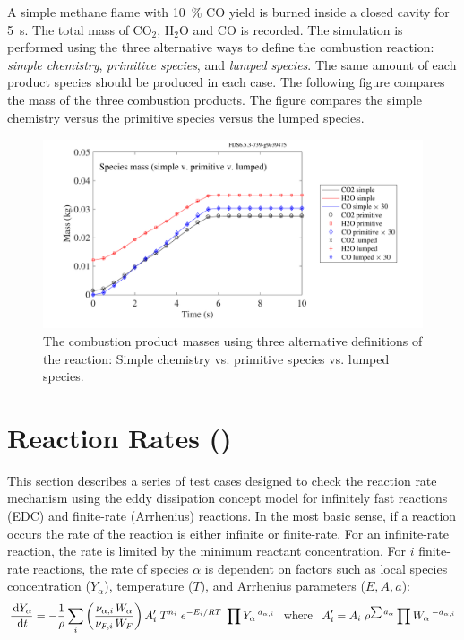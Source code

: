 \documentclass[11pt]{book}
\begin{document}
A simple methane flame with 10~\% CO yield is burned inside a closed cavity for 5~s.
The total mass of CO$_2$, H$_2$O and CO is recorded.
The simulation is performed using the three alternative ways
to define the combustion reaction: {\em simple chemistry}, {\em primitive species}, and {\em lumped species}. The
same amount of each product species should be produced in each case. The following figure compares the
mass of the three combustion products. The figure compares the simple chemistry versus the primitive species versus the lumped species.
\begin{figure}[ht]
\centering
\includegraphics[height=2.2in]{SCRIPT_FIGURES/methane_flame_reac_comp}
\caption[Yield of combustion products for alternative reactions]{The combustion product masses using three alternative definitions of the reaction:  Simple chemistry vs. primitive species vs. lumped species. }
\label{fig_methane_flame_yields}
\end{figure}


\section{Reaction Rates (\texorpdfstring{}{reactionrate})}

This section describes a series of test cases designed to check the reaction rate mechanism using the eddy dissipation concept model for infinitely fast reactions (EDC) and  finite-rate (Arrhenius) reactions. In the most basic sense, if a reaction occurs the rate of the reaction is either infinite or finite-rate. For an infinite-rate reaction, the rate is limited by the minimum reactant concentration. For $i$ finite-rate reactions, the rate of species $\alpha$ is dependent on factors such as local species concentration ($Y_{\alpha}$), temperature ($T$), and Arrhenius parameters ($E,A,a$):
\begin{equation}\label{eq:finite_rate1}
\frac{\,\mathrm{d} Y_{\alpha}}{\,\mathrm{d} t} = -\frac{1}{\rho}\sum_{i} \left(\frac{\nu_{\alpha,i}\,W_{\alpha}}{\nu_{F,i}\,W_{F}}\right)A_i^{\prime}\;T^{n_i}\;e^{-E_i/RT}\;\prod Y_{\alpha}\,^{a_{\alpha,i}} \;\;\; \text{where} \;\;\; A^{\prime}_{i} = A_{i}\;\rho^{\sum a_{\alpha}}\prod W_{\alpha}\,^{-a_{\alpha,i}}
\end{equation}
\end{document}
